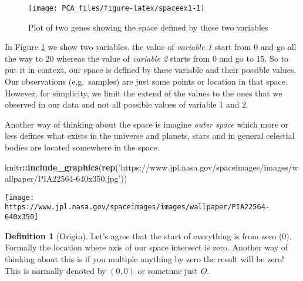 \documentclass[
]{book}
\newenvironment{Shaded}{\begin{snugshade}}{\end{snugshade}}
\newcommand{\KeywordTok}[1]{\textcolor[rgb]{0.13,0.29,0.53}{\textbf{#1}}}
\newcommand{\NormalTok}[1]{#1}
\newcommand{\OperatorTok}[1]{\textcolor[rgb]{0.81,0.36,0.00}{\textbf{#1}}}
\newcommand{\StringTok}[1]{\textcolor[rgb]{0.31,0.60,0.02}{#1}}
\theoremstyle{definition}
\newtheorem{definition}{Definition}[chapter]
\theoremstyle{definition}
\theoremstyle{definition}
\theoremstyle{remark}
\begin{document}
\begin{figure}

{\centering \texttt{[image: PCA\_files/figure-latex/spaceex1-1]} 

}

\caption{Plot of two genes showing the space defined by these two variables}\label{fig:spaceex1}
\end{figure}

In Figure \ref{fig:spaceex1} we show two variables. the value of \emph{variable 1} start from 0 and go all the way to 20 whereas the value of \emph{variable 2} starts from 0 and go to 15. So to put it in context, our space is defined by these variable and their possible values. Our observations (e.g.~samples) are just some points or location in that space. However, for simplicity, we limit the extend of the values to the ones that we observed in our data and not all possible values of variable 1 and 2.

Another way of thinking about the space is imagine \emph{outer space} which more or less defines what exists in the universe and planets, stars and in general celestial bodies are located somewhere in the space.

\begin{Shaded}
\begin{Highlighting}[]
\NormalTok{knitr}\OperatorTok{::}\KeywordTok{include_graphics}\NormalTok{(}\KeywordTok{rep}\NormalTok{(}\StringTok{'https://www.jpl.nasa.gov/spaceimages/images/wallpaper/PIA22564-640x350.jpg'}\NormalTok{))}
\end{Highlighting}
\end{Shaded}

\begin{center}\texttt{[image: https://www.jpl.nasa.gov/spaceimages/images/wallpaper/PIA22564-640x350]} \end{center}

\begin{definition}[Origin]
\protect\hypertarget{def:origin}{}{\label{def:origin} \iffalse (Origin) \fi{} }Let's agree that the start of everything is from zero (0). Formally the location where axis of our space intersect is zero. Another way of thinking about this is if you multiple anything by zero the result will be zero! This is normally denoted by \((0,0)\) or sometime just \(O\).
\end{definition}
\end{document}
